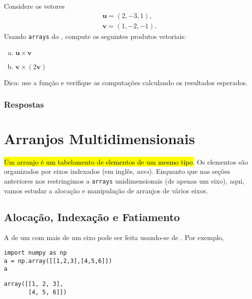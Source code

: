 \begin{exer}
  Considere os vetores
  \begin{align}
    & \pmb{u} = (2, -3, 1), \\
    & \pmb{v} = (1, -2, -1).
  \end{align}
  Usando \texttt{arrays} do {\numpy}, compute os seguintes produtos vetoriais:
  \begin{enumerate}[a)]
  \item $\pmb{u}\times\pmb{v}$
  \item $\pmb{v}\times (2\pmb{v})$
  \end{enumerate}
\end{exer}
\begin{resp}
  Dica: use a função {\PYTHONnumpyDOTcross} e verifique as computações calculando os resultados esperados.
\end{resp}

\ifisbook
\subsubsection{Respostas}
\shipoutAnswer
\fi

\section{Arranjos Multidimensionais}\label{cap_arr_sec_multi}

\hl{Um arranjo {\PYTHONnumpyDOTarray} é um tabelamento de elementos de um mesmo tipo}. Os elementos são organizados por eixos indexados (em inglês, \textit{axes}). Enquanto que nas seções anteriores nos restringimos a \texttt{arrays} unidimensionais (de apenas um eixo), aqui, vamos estudar a alocação e manipulação de arranjos de vários eixos.

\subsection{Alocação, Indexação e Fatiamento}

A  de um {\PYTHONnumpyDOTarray} com mais de um eixo pode ser feita usando-se de . Por exemplo,

\begin{lstlisting}
import numpy as np
a = np.array([[1,2,3],[4,5,6]])
a
\end{lstlisting}

\begin{verbatim}
array([[1, 2, 3],
       [4, 5, 6]])
\end{verbatim}

